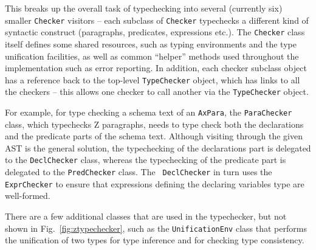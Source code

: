\documentclass{llncs}
\begin{document}
This breaks up the overall task of typechecking into several
(currently six) smaller \texttt{Checker} visitors -- each subclass of
\texttt{Checker} typechecks a different kind of syntactic construct
(paragraphs, predicates, expressions etc.).  The \texttt{Checker}
class itself defines some shared resources, such as typing
environments and the type unification facilities, as well as common
``helper'' methods used throughout the implementation such as error
reporting.  In addition, each checker subclass object has a reference
back to the top-level \texttt{TypeChecker} object, which has links to
all the checkers -- this allows one checker to call another via the
\texttt{TypeChecker} object.

For example, for type checking a schema text of an {\tt AxPara}, the
{\tt ParaChecker} class, which typechecks Z paragraphs, needs to type
check both the declarations and the predicate parts of the schema
text.  Although visiting through the given AST is the general
solution, the typechecking of the declarations part is delegated to
the {\tt DeclChecker} class, whereas the typechecking of the predicate
part is delegated to the {\tt PredChecker} class.  The {\tt
DeclChecker} in turn uses the {\tt ExprChecker} to ensure that
expressions defining the declaring variables type are well-formed.

There are a few additional classes that are used in the typechecker,
but not shown in Fig.~\ref{fig:ztypechecker}, such as the
\texttt{UnificationEnv} class that performs
the unification of two types for type inference and for checking type
consistency.
\end{document}
